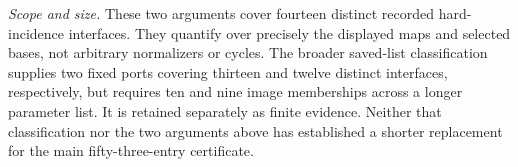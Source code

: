 \emph{Scope and size.} These two arguments cover fourteen distinct
recorded hard-incidence interfaces. They quantify over precisely the
displayed maps and selected bases, not arbitrary normalizers or cycles.
The broader saved-list classification supplies two fixed ports covering
thirteen and twelve distinct interfaces, respectively, but requires
ten and nine image memberships across a longer parameter list.
It is retained separately as finite evidence. Neither that classification
nor the two arguments above has established a shorter replacement for
the main fifty-three-entry certificate.
